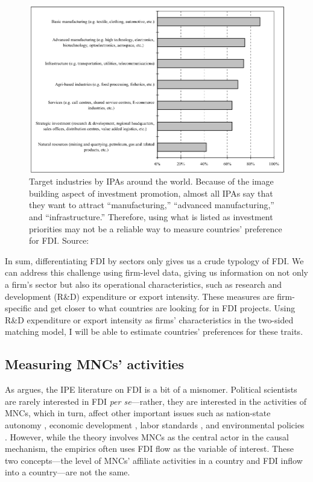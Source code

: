 \begin{figure}[tbp] \centering
  \includegraphics[width=\textwidth,keepaspectratio]{../figure/IPA_target_industries}
  \caption[Target industries by IPA around the world.]{Target industries by IPAs
    around the world. Because of the image building aspect of investment
    promotion, almost all IPAs say that they want to attract ``manufacturing,''
    ``advanced manufacturing,'' and ``infrastructure.'' Therefore, using what is
    listed as investment priorities may not be a reliable way to measure
    countries' preference for FDI. Source: \citet{UNCTAD2001}}
  \label{fig:IPA_target_industries}
\end{figure}

In sum, differentiating FDI by sectors only gives us a crude typology of FDI. We
can address this challenge using firm-level data, giving us information on not
only a firm's sector but also its operational characteristics, such as research
and development (R\&D) expenditure or export intensity. These measures are
firm-specific and get closer to what countries are looking for in FDI projects.
Using R\&D expenditure or export intensity as firms' characteristics in the
two-sided matching model, I will be able to estimate countries' preferences for
these traits.

\subsection{Measuring MNCs' activities}

As \citet{Kerner2014} argues, the IPE literature on FDI is a bit of a misnomer.
Political scientists are rarely interested in FDI \textit{per se}---rather, they
are interested in the activities of MNCs, which in turn, affect other important
issues such as nation-state autonomy \citep{Mosley2005}, economic development
\citep{Moran1998}, labor standards \citep{Mosley2007}, and environmental
policies \citep{Prakash2007}. However, while the theory involves MNCs as the
central actor in the causal mechanism, the empirics often uses FDI flow as the
variable of interest. These two concepts---the level of MNCs' affiliate
activities in a country and FDI inflow into a country---are not the same.


